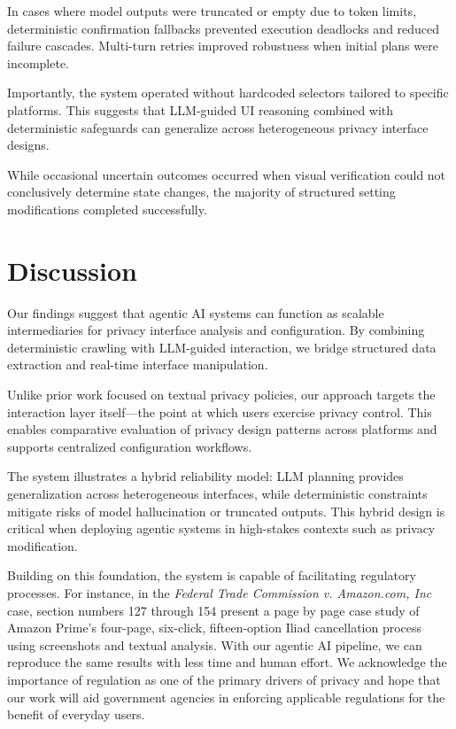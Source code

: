 \documentclass[12pt,letterpaper]{article}
\begin{document}
In cases where model outputs were truncated or empty due to token limits, deterministic confirmation fallbacks prevented execution deadlocks and reduced failure cascades. Multi-turn retries improved robustness when initial plans were incomplete.

Importantly, the system operated without hardcoded selectors tailored to specific platforms. This suggests that LLM-guided UI reasoning combined with deterministic safeguards can generalize across heterogeneous privacy interface designs.

While occasional uncertain outcomes occurred when visual verification could not conclusively determine state changes, the majority of structured setting modifications completed successfully.


\section{Discussion}
Our findings suggest that agentic AI systems can function as scalable intermediaries for privacy interface analysis and configuration. By combining deterministic crawling with LLM-guided interaction, we bridge structured data extraction and real-time interface manipulation.

Unlike prior work focused on textual privacy policies, our approach targets the interaction layer itself—the point at which users exercise privacy control. This enables comparative evaluation of privacy design patterns across platforms and supports centralized configuration workflows.

The system illustrates a hybrid reliability model: LLM planning provides generalization across heterogeneous interfaces, while deterministic constraints mitigate risks of model hallucination or truncated outputs. This hybrid design is critical when deploying agentic systems in high-stakes contexts such as privacy modification.

Building on this foundation, the system is capable of facilitating regulatory processes. For instance, in the \textit{Federal Trade Commission v. Amazon.com, Inc} case, section numbers 127 through 154 present a page by page case study of Amazon Prime's four-page, six-click, fifteen-option Iliad cancellation process using screenshots and textual analysis. With our agentic AI pipeline, we can reproduce the same results with less time and human effort. We acknowledge the importance of regulation as one of the primary drivers of privacy and hope that our work will aid government agencies in enforcing applicable regulations for the benefit of everyday users.
\end{document}
